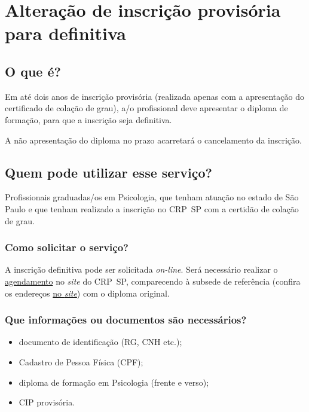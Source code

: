 \chapter{Alteração de inscrição provisória para definitiva}
\label{chap:pf-inscricao_definitiva}

\section{O que é?}

Em até dois anos de inscrição provisória (realizada apenas com a apresentação do certificado de colação de grau), a/o profissional deve
apresentar o diploma de formação, para que a inscrição seja definitiva.

A não apresentação do diploma no prazo acarretará o cancelamento da inscrição.

\section{Quem pode utilizar esse serviço?}

Profissionais graduadas/os em Psicologia, que tenham atuação no estado de São Paulo e que tenham realizado a inscrição no CRP~SP com a certidão de colação de grau.

\subsection{Como solicitar o serviço?}

A inscrição definitiva pode ser solicitada \emph{on-line}. Será necessário realizar o \href{https://www.crpsp.org/pagina/view/311}{agendamento} no \emph{site} do CRP~SP, comparecendo à subsede de referência (confira os endereços \href{https://www.crpsp.org/sede/index}{no \emph{site}}) com o diploma original.

\subsection{Que informações ou documentos são 	necessários?}

\begin{itemize}
	\item
	documento de identificação (RG, CNH etc.);
	\item
	Cadastro de Pessoa Física (CPF);
	\item
	diploma de formação em Psicologia (frente e verso);
	\item
	CIP provisória.
\end{itemize}

